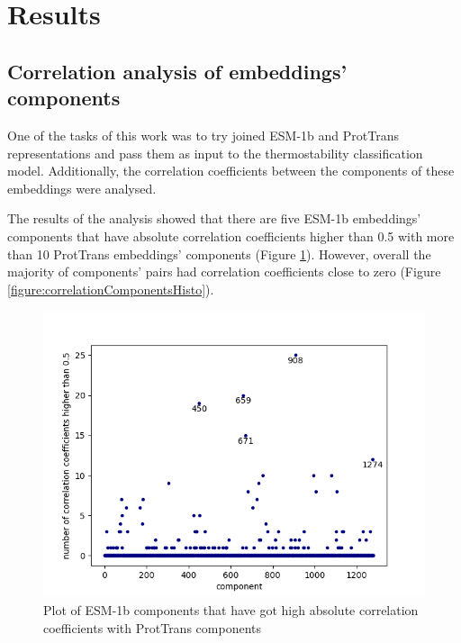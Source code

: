 \documentclass[12pt]{article}
\begin{document}
	\newpage

	\section{Results}

	\subsection{Correlation analysis of embeddings' components}

	One of the tasks of this work was to try joined ESM-1b and ProtTrans 
	representations and pass them as input to the thermostability 
	classification model. Additionally, the correlation 
	coefficients between the components of these embeddings were analysed. 

	The results of the analysis showed that there are five ESM-1b
	embeddings' components that have absolute correlation coefficients 
	higher than 0.5 with more than 10 ProtTrans embeddings' components  
	(Figure \ref{figure:highCorrelationComponents}). However, overall the 
	majority of components' pairs had correlation coefficients close to zero 
	(Figure \ref{figure:correlationComponentsHisto}).

	\begin{figure}[h!]
		\centering
		\includegraphics[scale=0.85]{validation_small_set_2_joined_correlation_high_corr.png}

		\caption{Plot of ESM-1b components that have got high absolute correlation 
		coefficients with ProtTrans components}
		\label{figure:highCorrelationComponents}
	\end{figure}
\end{document}
